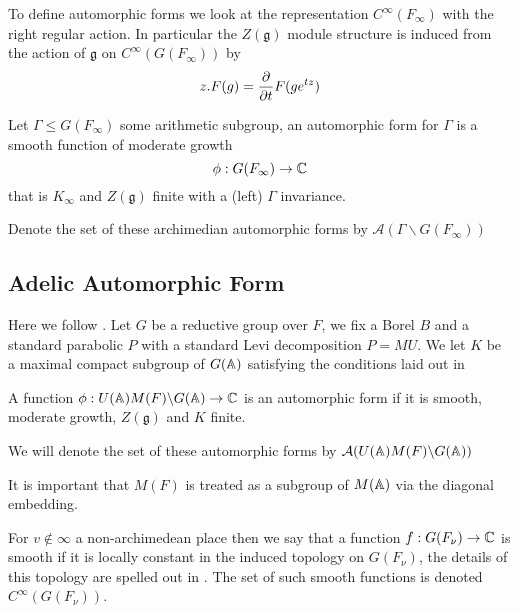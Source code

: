	To define automorphic forms we look at the representation \(C^\infty(F_\infty)\) with the right regular action.  In particular the \(Z(\mathfrak{g})\) module structure is induced from the action of \(\mathfrak{g}\) on \(C^\infty(G(F_\infty))\) by 
	\[z.F(g) = \frac{\partial }{\partial t}F(ge^{tz})\] 

	\begin{Definition}
		Let \(\Gamma\leq G(F_\infty)\) some arithmetic subgroup, an automorphic form for \(\Gamma\) is a smooth function of moderate growth 
		\[\phi: G(F_\infty) \to \C\]
		that is \(K_\infty\) and \(Z(\mathfrak{g})\) finite with a (left) \(\Gamma\) invariance. 

		Denote the set of these archimedian automorphic forms by \(\mathcal{A}(\Gamma \backslash G(F_\infty))\)

	\end{Definition}


\subsection{Adelic Automorphic Form}
Here we follow \cite[I.2.17]{moeglinSpectralDecompositionEisenstein1995}. Let \(G\) be a reductive group over \(F\), we fix a Borel \(B\) and a standard parabolic \(P \) with a standard Levi decomposition \(P = MU\). We let \(K\) be a maximal compact subgroup of \(G(\A)\) satisfying the conditions laid out in 
\begin{definition}
    A function \(\phi: U(\A)M(F)\backslash G(\A) \to \C\) is an automorphic form if it is smooth, moderate growth, \(Z(\mathfrak{g})\) and \(K\) finite. 

	We will denote the set of these automorphic forms by \(\mathcal{A}(U(\A)M(F)\backslash G(\A))\)
\end{definition}

\begin{remark}
    It is important that \(M(F)\) is treated as a subgroup of \(M(\A)\) via the diagonal embedding.
\end{remark}

For \(v\notin \infty\) a non-archimedean place then we say that a function \(f: G(F_\nu) \to \C\) is smooth if it is locally constant in the induced topology on \(G(F_\nu)\), the details of this topology are spelled out in \cite{conradWeilGrothendieckApproaches2012}. The set of such smooth functions is denoted \(C^\infty(G(F_\nu))\).
	
